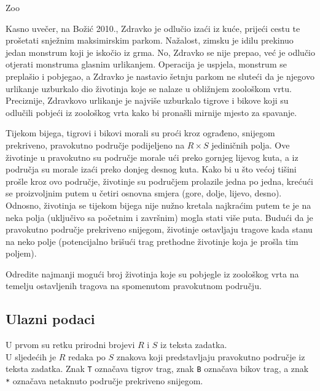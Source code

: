 \begin{statement}[
  problempoints=110,
  timelimit=1 sekunda,
  memorylimit=512 MiB,
]{Zoo}


Kasno uvečer, na Božić 2010., Zdravko je odlučio izaći iz kuće, prijeći cestu te
prošetati snježnim maksimirskim parkom. Nažalost, zimsku je idilu prekinuo jedan
monstrum koji je iskočio iz grma. No, Zdravko se nije prepao, već je odlučio
otjerati monstruma glasnim urlikanjem. Operacija je uspjela, monstrum se
preplašio i pobjegao, a Zdravko je nastavio šetnju parkom ne sluteći da je
njegovo urlikanje uzburkalo dio životinja koje se nalaze u obližnjem zoološkom
vrtu. Preciznije, Zdravkovo urlikanje je najviše uzburkalo tigrove i bikove koji
su odlučili pobjeći iz zoološkog vrta kako bi pronašli mirnije mjesto za
spavanje.

Tijekom bijega, tigrovi i bikovi morali su proći kroz ograđeno, snijegom
prekriveno, pravokutno područje podijeljeno na $R \times S$ jediničnih polja.
Ove životinje u pravokutno su područje morale ući preko gornjeg lijevog kuta, a
iz područja su morale izaći preko donjeg desnog kuta. Kako bi u što većoj tišini
prošle kroz ovo područje, životinje su područjem prolazile jedna po jedna,
krećući se proizvoljnim putem u četiri osnovna smjera (gore, dolje, lijevo,
desno). Odnosno, životinja se tijekom bijega nije nužno kretala najkraćim putem
te je na neka polja (uključivo sa početnim i završnim) mogla stati više puta.
Budući da je pravokutno područje prekriveno snijegom, životinje ostavljaju
tragove kada stanu na neko polje (potencijalno brišući trag prethodne životinje
koja je prošla tim poljem).

Odredite najmanji mogući broj životinja koje su pobjegle iz zoološkog vrta na
temelju ostavljenih tragova na spomenutom pravokutnom području.

\subsection*{Ulazni podaci}
U prvom su retku prirodni brojevi $R$ i $S$ iz teksta zadatka. \\
U sljedećih je $R$ redaka po $S$ znakova koji predstavljaju pravokutno područje
iz teksta zadatka. Znak \texttt{T} označava tigrov trag, znak \texttt{B}
označava bikov trag, a znak \texttt{*} označava netaknuto područje prekriveno
snijegom.


\end{statement}
